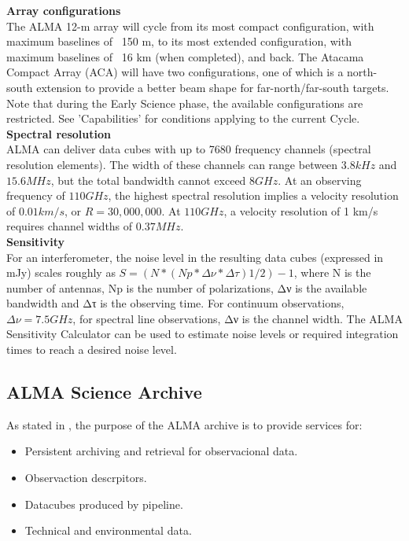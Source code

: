 \textbf{Array configurations}\\
The ALMA 12-m array will cycle from its most compact configuration, with maximum baselines of ~150 m, to its most extended configuration, with maximum baselines of ~16 km (when completed), and back. The Atacama Compact Array (ACA) will have two configurations, one of which is a north-south extension to provide a better beam shape for far-north/far-south targets. Note that during the Early Science phase, the available configurations are restricted. See 'Capabilities' for conditions applying to the current Cycle.\\

\textbf{Spectral resolution}\\
ALMA can deliver data cubes with up to 7680 frequency channels (spectral resolution elements). The width of these channels can range between $3.8 kHz$ and $15.6 MHz$, but the total bandwidth cannot exceed $8 GHz$. At an observing frequency of $110 GHz$, the highest spectral resolution implies a velocity resolution of $0.01 km/s$, or $R=30,000,000$. At $110 GHz$, a velocity resolution of 1 km/s requires channel widths of $0.37 MHz$.\\

\textbf{Sensitivity}\\
For an interferometer, the noise level in the resulting data cubes (expressed in mJy) scales roughly as $S=(N*(Np*Δ\nu * Δ\tau)1/2)-1$, where N is the number of antennas, Np is the number of polarizations, Δν is the available bandwidth and Δτ is the observing time. For continuum observations, $Δ\nu=7.5 GHz$, for spectral line observations, Δν is the channel width. The ALMA Sensitivity Calculator can be used to estimate noise levels or required integration times to reach a desired noise level.

\subsection{ALMA Science Archive}

As stated in \cite{Etoka12}, the purpose of the ALMA archive is to provide services for:

\begin{itemize}
\item Persistent archiving and retrieval for observacional data.
\item Observaction descrpitors.
\item Datacubes produced by pipeline.
\item Technical and environmental data.
\end{itemize}

